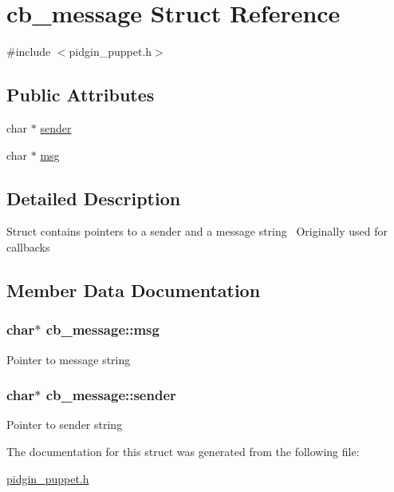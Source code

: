 \hypertarget{structcb__message}{}\section{cb\+\_\+message Struct Reference}
\label{structcb__message}


{\ttfamily \#include $<$pidgin\+\_\+puppet.\+h$>$}

\subsection*{Public Attributes}
\begin{DoxyCompactItemize}
\item 
char $\ast$ \hyperlink{structcb__message_a3dd747fa32b52043c5ad834acf647385}{sender}
\item 
char $\ast$ \hyperlink{structcb__message_a30549ac3a0c251ec2611d4ef6b1ada4f}{msg}
\end{DoxyCompactItemize}


\subsection{Detailed Description}
Struct contains pointers to a sender and a message string~\newline
 Originally used for callbacks 

\subsection{Member Data Documentation}
\subsubsection[{\texorpdfstring{msg}{msg}}]{\setlength{\rightskip}{0pt plus 5cm}char$\ast$ cb\+\_\+message\+::msg}\hypertarget{structcb__message_a30549ac3a0c251ec2611d4ef6b1ada4f}{}\label{structcb__message_a30549ac3a0c251ec2611d4ef6b1ada4f}
Pointer to message string 
\subsubsection[{\texorpdfstring{sender}{sender}}]{\setlength{\rightskip}{0pt plus 5cm}char$\ast$ cb\+\_\+message\+::sender}\hypertarget{structcb__message_a3dd747fa32b52043c5ad834acf647385}{}\label{structcb__message_a3dd747fa32b52043c5ad834acf647385}
Pointer to sender string 

The documentation for this struct was generated from the following file\+:\begin{DoxyCompactItemize}
\item 
\hyperlink{pidgin__puppet_8h}{pidgin\+\_\+puppet.\+h}\end{DoxyCompactItemize}
